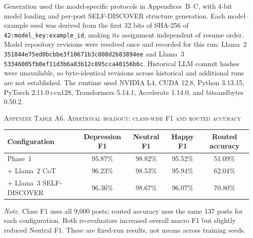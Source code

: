 \documentclass{ieeeaccess}
\begin{document}
\par\smallskip
Generation used the model-specific protocols in Appendices~B--C, with 4-bit model loading and per-post SELF-DISCOVER structure generation. Each model--example seed was derived from the first 32 bits of SHA-256 of \texttt{42:model\_key:example\_id}, making its assignment independent of resume order. Model repository revisions were resolved once and recorded for this run: Llama~2 \texttt{351844e75ed0bcbbe3f10671b3c808d2b83894ee} and Llama~3 \texttt{53346005fb0ef11d3b6a83b12c895cca40156b6c}. Historical LLM commit hashes were unavailable, so byte-identical revisions across historical and additional runs are not established. The runtime used NVIDIA L4, CUDA 12.8, Python 3.13.15, PyTorch 2.11.0+cu128, Transformers 5.14.1, Accelerate 1.14.0, and bitsandbytes 0.50.2.

\par\medskip
{}
\noindent\textsc{Appendix Table A6. Additional holdout: class-wise F1 and routed accuracy}\par
\smallskip
\small
\setlength{\tabcolsep}{5pt}
\renewcommand{\arraystretch}{1.16}
\noindent\begin{tabularx}{\textwidth}{@{}Y c c c c@{}}
\toprule
Configuration & Depression F1 & Neutral F1 & Happy F1 & Routed accuracy \\
\midrule
Phase~1 & 95.87\% & 98.82\% & 95.52\% & 51.09\% \\
+ Llama~2 CoT & 96.23\% & 98.53\% & 95.94\% & 62.04\% \\
+ Llama~3 SELF-DISCOVER & 96.36\% & 98.67\% & 96.07\% & 70.80\% \\
\bottomrule
\end{tabularx}
\par\smallskip
\noindent\footnotesize\textit{Note.} Class F1 uses all 9,000 posts; routed accuracy uses the same 137 posts for each configuration. Both re-evaluators increased overall macro F1 but slightly reduced Neutral F1. These are fixed-run results, not means across training seeds.\normalsize
\end{document}
